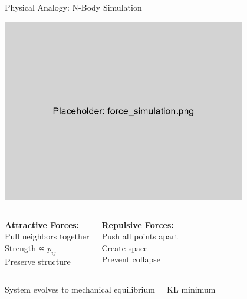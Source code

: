 \documentclass[aspectratio=169]{beamer}
\begin{document}
\begin{frame}{Physical Analogy: N-Body Simulation}
\begin{center}
\includegraphics[width=0.8\textwidth]{./Figures/force_simulation.png}
\end{center}

\begin{columns}
\textbf{Attractive Forces:}\\
Pull neighbors together\\
Strength ∝ $p_{ij}$\\
Preserve structure

\textbf{Repulsive Forces:}\\
Push all points apart\\
Create space\\
Prevent collapse
\end{columns}

\colorbox{green!30}{System evolves to mechanical equilibrium = KL minimum}
\end{frame}
\end{document}
